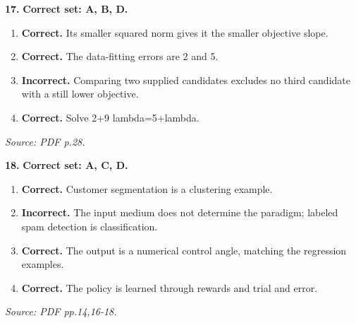\documentclass[11pt,a4paper]{article}
\begin{document}
\par\noindent\begin{minipage}{\linewidth}
\textbf{17.} \textbf{Correct set: A, B, D.}
\begin{enumerate}[label=(\Alph*),leftmargin=8mm,itemsep=2pt,topsep=2pt]
\item \textbf{Correct.} Its smaller squared norm gives it the smaller objective slope.
\item \textbf{Correct.} The data-fitting errors are 2 and 5.
\item \textbf{Incorrect.} Comparing two supplied candidates excludes no third candidate with a still lower objective.
\item \textbf{Correct.} Solve 2+9 lambda=5+lambda.
\end{enumerate}
{\footnotesize\textit{Source: PDF p.28.}}

\end{minipage}\par\vspace{3mm}
\par\noindent\begin{minipage}{\linewidth}
\textbf{18.} \textbf{Correct set: A, C, D.}
\begin{enumerate}[label=(\Alph*),leftmargin=8mm,itemsep=2pt,topsep=2pt]
\item \textbf{Correct.} Customer segmentation is a clustering example.
\item \textbf{Incorrect.} The input medium does not determine the paradigm; labeled spam detection is classification.
\item \textbf{Correct.} The output is a numerical control angle, matching the regression examples.
\item \textbf{Correct.} The policy is learned through rewards and trial and error.
\end{enumerate}
{\footnotesize\textit{Source: PDF pp.14,16-18.}}

\end{minipage}\par\vspace{3mm}
\end{document}
